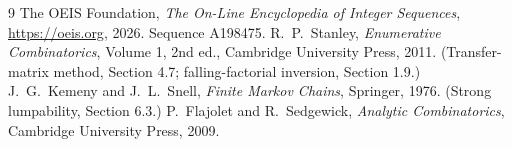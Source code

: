 \documentclass[11pt,a4paper]{article}
\theoremstyle{plain}
\theoremstyle{definition}
\begin{document}
\begin{thebibliography}{9}
 The OEIS Foundation, \emph{The On-Line Encyclopedia of Integer
Sequences}, \url{https://oeis.org}, 2026. Sequence A198475.
 R.~P.~Stanley, \emph{Enumerative Combinatorics}, Volume 1, 2nd ed.,
Cambridge University Press, 2011. (Transfer-matrix method, Section 4.7; falling-factorial
inversion, Section 1.9.)
 J.~G.~Kemeny and J.~L.~Snell, \emph{Finite Markov Chains}, Springer,
1976. (Strong lumpability, Section 6.3.)
 P.~Flajolet and R.~Sedgewick, \emph{Analytic Combinatorics}, Cambridge
University Press, 2009.
\end{thebibliography}
\end{document}

